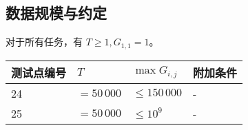 \documentclass[UTF8, 11pt, a4paper]{article}
\begin{document}
\subsection*{数据规模与约定}
对于所有任务，有 $T \geq 1, G_{1, 1} = 1$。

\begin{table}[h]\centering
\begin{tabularx}{0.85 \textwidth}{X|X|X|X} \hline
测试点编号 & $T$         & $\max{G_{i, j}}$ & 附加条件 \\ \hline\hline
24         & $= 50\,000$ & $\leq 150\,000$  & - \\ \hline
25         & $= 50\,000$ & $\leq 10^9$      & - \\ \hline
\end{tabularx}
\end{table}
\end{document}

